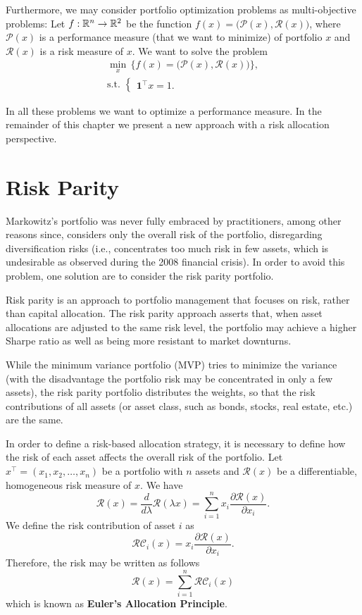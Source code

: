 Furthermore, we may consider portfolio optimization problems as multi-objective problems: Let $f:\mathbb{R}^n\to\mathbb{R}^2$ be the function $f(x)= \big(\mathcal{P}(x), \mathcal{R}(x)\big)$, where $\mathcal{P}(x)$ is a performance measure (that we want to minimize) of portfolio $x$ and $\mathcal{R}(x)$ is a risk measure of $x$. We want to solve the problem
\begin{eqnarray*}
	\min_{x} \,\Big\{f(x)= \big(\mathcal{P}(x), \mathcal{R}(x)\big)\Big\}, \\
	\mbox{s.t. }\left\{
	\begin{aligned}\nonumber
		\mathbf{1}^\top x=1.
	\end{aligned}
	\right.
\end{eqnarray*}

In all these problems we want to optimize a performance measure. In the remainder of this chapter we present a new approach with a risk allocation perspective.


\section{Risk Parity}

Markowitz’s portfolio was never fully embraced by practitioners, among other reasons since, considers only the overall risk of the portfolio, disregarding diversification risks (i.e., concentrates too much risk in few assets, which is undesirable as observed during the 2008 financial crisis). In order to avoid this problem, one solution are to consider the risk parity portfolio.

Risk parity is an approach to portfolio management that focuses on risk, rather than capital allocation. The risk parity approach asserts that, when asset allocations are adjusted to the same risk level, the portfolio may achieve a higher Sharpe ratio as well as being more resistant to market downturns.

While the minimum variance portfolio  (MVP) tries to minimize the variance (with the disadvantage the portfolio risk may be concentrated in only a few assets), the risk parity portfolio distributes the weights, so that the risk contributions of all assets (or asset class, such as bonds, stocks, real estate, etc.) are the same.

In order to define a risk-based allocation strategy, it is necessary to define how the risk of each asset affects the overall risk of the portfolio.
Let $x^\top=(x_1,x_2,\dots,x_n)$ be a portfolio with $n$ assets and $\mathcal{R}(x)$ be a differentiable, homogeneous risk measure of $x$. We have
\[
	\mathcal{R}(x)=\frac{d}{d\lambda}\mathcal{R}(\lambda x)=\sum_{i=1}^n x_i \frac{\partial \mathcal{R} (x)}{\partial x_i}.
\]
We define the risk contribution of asset $i$  as
\[
	\mathcal{RC}_i(x)= x_i \frac{\partial \mathcal{R}(x)}{\partial x_i}.
\]
Therefore, the risk may be written as follows
\[
	\mathcal{R}(x)=\sum_{i=1}^n \mathcal{RC}_i(x)
\]
which is known as \textbf{Euler's Allocation Principle}.

